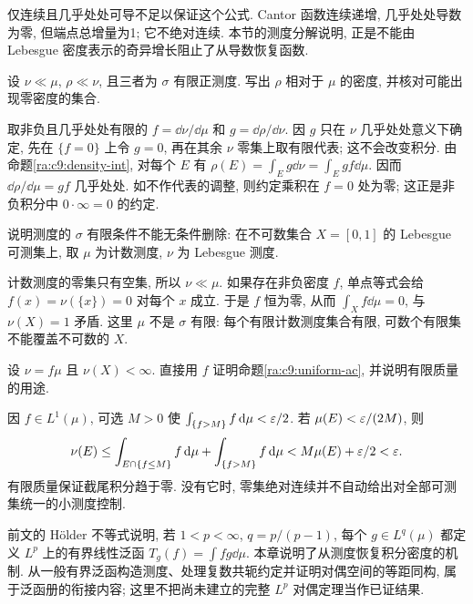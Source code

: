 仅连续且几乎处处可导不足以保证这个公式. Cantor 函数连续递增, 几乎处处导数为零, 但端点总增量为1; 它不绝对连续. 本节的测度分解说明, 正是不能由 Lebesgue 密度表示的奇异增长阻止了从导数恢复函数.

\begin{exercise}
设 $\nu\ll\mu$, $\rho\ll\nu$, 且三者为 $\sigma$ 有限正测度. 写出 $\rho$ 相对于 $\mu$ 的密度, 并核对可能出现零密度的集合.
\end{exercise}
\begin{solution}
取非负且几乎处处有限的 $f=\dd\nu/\dd\mu$ 和 $g=\dd\rho/\dd\nu$. 因 $g$ 只在 $\nu$ 几乎处处意义下确定, 先在 $\{f=0\}$ 上令 $g=0$, 再在其余 $\nu$ 零集上取有限代表; 这不会改变积分. 由命题\ref{ra:c9:density-int}, 对每个 $E$ 有 $\rho(E)=\int_Eg\dd\nu=\int_Egf\dd\mu$. 因而 $\dd\rho/\dd\mu=gf$ 几乎处处. 如不作代表的调整, 则约定乘积在 $f=0$ 处为零; 这正是非负积分中 $0\cdot\infty=0$ 的约定.
\end{solution}

\begin{exercise}
说明测度的 $\sigma$ 有限条件不能无条件删除: 在不可数集合 $X=[0,1]$ 的 Lebesgue 可测集上, 取 $\mu$ 为计数测度, $\nu$ 为 Lebesgue 测度.
\end{exercise}
\begin{solution}
计数测度的零集只有空集, 所以 $\nu\ll\mu$. 如果存在非负密度 $f$, 单点等式会给 $f(x)=\nu(\{x\})=0$ 对每个 $x$ 成立. 于是 $f$ 恒为零, 从而 $\int_X f\dd\mu=0$, 与 $\nu(X)=1$ 矛盾. 这里 $\mu$ 不是 $\sigma$ 有限: 每个有限计数测度集合有限, 可数个有限集不能覆盖不可数的 $X$.
\end{solution}

\begin{exercise}
设 $\nu=f\mu$ 且 $\nu(X)<\infty$. 直接用 $f$ 证明命题\ref{ra:c9:uniform-ac}, 并说明有限质量的用途.
\end{exercise}
\begin{solution}
因 $f\in L^1(\mu)$, 可选 $M>0$ 使 $\int_{\{f>M\}}f\,\mathrm d\mu<\varepsilon/2$. 若 $\mu(E)<\varepsilon/(2M)$, 则
\[
 \nu(E)\le\int_{E\cap\{f\le M\}}f\,\mathrm d\mu
       +\int_{\{f>M\}}f\,\mathrm d\mu
 <M\mu(E)+\varepsilon/2<\varepsilon.
\]
有限质量保证截尾积分趋于零. 没有它时, 零集绝对连续并不自动给出对全部可测集统一的小测度控制.
\end{solution}

前文的 Hölder 不等式说明, 若 $1<p<\infty$, $q=p/(p-1)$, 每个 $g\in L^q(\mu)$ 都定义 $L^p$ 上的有界线性泛函 $T_g(f)=\int fg\dd\mu$. 本章说明了从测度恢复积分密度的机制. 从一般有界泛函构造测度、处理复数共轭约定并证明对偶空间的等距同构, 属于泛函册的衔接内容; 这里不把尚未建立的完整 $L^p$ 对偶定理当作已证结果.

